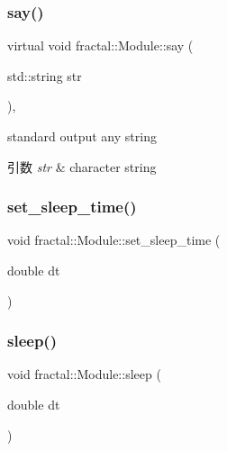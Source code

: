 \mbox{\label{classfractal_1_1Module_afd605b7a7ef55d5d0a55f520ff8feb86}} 
\subsubsection{\texorpdfstring{say()}{say()}}
{\footnotesize\ttfamily virtual void fractal\+::\+Module\+::say (\begin{DoxyParamCaption}\item[{std\+::string}]{str }\end{DoxyParamCaption})\hspace{0.3cm}{\ttfamily [inline]}, {\ttfamily [virtual]}}



standard output any string 


\begin{DoxyParams}{引数}
{\em str} & character string \\
\hline
\end{DoxyParams}
\mbox{\label{classfractal_1_1Module_a4cd49e1c42043ea4254a8859992f5a64}} 
\subsubsection{\texorpdfstring{set\+\_\+sleep\+\_\+time()}{set\_sleep\_time()}}
{\footnotesize\ttfamily void fractal\+::\+Module\+::set\+\_\+sleep\+\_\+time (\begin{DoxyParamCaption}\item[{double}]{dt }\end{DoxyParamCaption})\hspace{0.3cm}{\ttfamily [inline]}}

\mbox{\label{classfractal_1_1Module_aba781b23b4f5ae00609f1daee3a0072c}} 
\subsubsection{\texorpdfstring{sleep()}{sleep()}}
{\footnotesize\ttfamily void fractal\+::\+Module\+::sleep (\begin{DoxyParamCaption}\item[{double}]{dt }\end{DoxyParamCaption})\hspace{0.3cm}{\ttfamily [inline]}}

